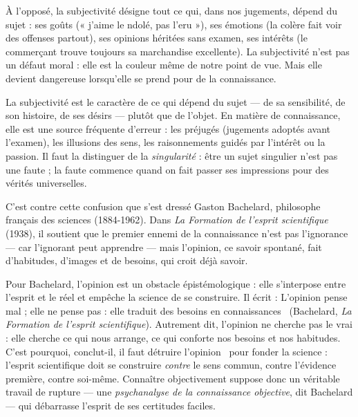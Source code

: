 \documentclass[11pt]{article}
\newcommand{\cle}[1]{{\popxbold\color{popdark}#1}}
\newcounter{popsec}
\newcounter{popsub}
\newcommand{\courssub}[1]{%
  \stepcounter{popsub}%
  \par\vspace{9pt}\noindent{\popxbold\fontsize{11.5}{13}\selectfont\color{popink}{\color{poporange}\thepopsec.\thepopsub}\hspace{6pt}#1}\par\nopagebreak\vspace{4pt}
}
\begin{document}
\courssub{La subjectivité : ce qui dépend du sujet}

À l'opposé, la \cle{subjectivité} désigne tout ce qui, dans nos jugements, dépend du sujet : ses goûts (« j'aime le ndolé, pas l'eru »), ses émotions (la colère fait voir des offenses partout), ses opinions héritées sans examen, ses intérêts (le commerçant trouve toujours sa marchandise excellente). La subjectivité n'est pas un défaut moral : elle est la couleur même de notre point de vue. Mais elle devient dangereuse lorsqu'elle se prend pour de la connaissance.

\begin{definition}[La subjectivité]
La \cle{subjectivité} est le caractère de ce qui dépend du sujet — de sa sensibilité, de son histoire, de ses désirs — plutôt que de l'objet. En matière de connaissance, elle est une source fréquente d'\cle{erreur} : les préjugés (jugements adoptés avant l'examen), les illusions des sens, les raisonnements guidés par l'intérêt ou la passion. Il faut la distinguer de la \emph{singularité} : être un sujet singulier n'est pas une faute ; la faute commence quand on fait passer ses impressions pour des vérités universelles.
\end{definition}

C'est contre cette confusion que s'est dressé Gaston Bachelard, philosophe français des sciences (1884-1962). Dans \emph{La Formation de l'esprit scientifique} (1938), il soutient que le premier ennemi de la connaissance n'est pas l'ignorance — car l'ignorant peut apprendre — mais l'\cle{opinion}, ce savoir spontané, fait d'habitudes, d'images et de besoins, qui croit déjà savoir.

\begin{propriete}
Pour Bachelard, l'opinion est un \cle{obstacle épistémologique} : elle s'interpose entre l'esprit et le réel et empêche la science de se construire. Il écrit : \guillemotleft L'opinion pense mal ; elle ne pense pas : elle traduit des besoins en connaissances \guillemotright\ (Bachelard, \emph{La Formation de l'esprit scientifique}). Autrement dit, l'opinion ne cherche pas le vrai : elle cherche ce qui nous arrange, ce qui conforte nos besoins et nos habitudes. C'est pourquoi, conclut-il, \guillemotleft il faut détruire l'opinion \guillemotright\ pour fonder la science : l'esprit scientifique doit se construire \emph{contre} le sens commun, contre l'évidence première, contre soi-même. Connaître objectivement suppose donc un véritable travail de rupture — une \emph{psychanalyse de la connaissance objective}, dit Bachelard — qui débarrasse l'esprit de ses certitudes faciles.
\end{propriete}
\end{document}
